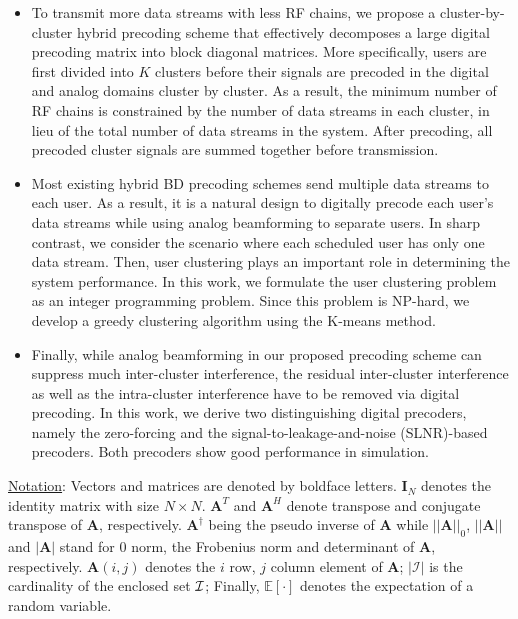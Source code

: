 \documentclass[conference]{IEEEtran}
\begin{document}
\begin{itemize}[leftmargin=*]
\item To transmit more data streams with less RF chains, we propose a cluster-by-cluster hybrid precoding scheme that effectively decomposes a large digital precoding matrix into block diagonal matrices. More specifically, users are first divided into $K$ clusters before their signals are precoded in the digital and analog domains cluster by cluster. As a result, the minimum number of RF chains is constrained by the number of data streams in each cluster, in lieu of the total number of data streams in the system. After precoding, all precoded cluster signals are summed together before transmission.
\item Most existing hybrid BD precoding schemes send multiple data streams to each user. As a result, it is a natural design to digitally precode each user's data streams while using analog beamforming to separate users. In sharp contrast, we consider the scenario where each scheduled user has only one data stream. Then, user clustering plays an important role in determining the system performance. In this work, we formulate the user clustering problem as an integer programming problem. Since this problem is NP-hard, we develop a greedy clustering algorithm using the K-means method.
\item Finally, while analog beamforming in our proposed precoding scheme can suppress much inter-cluster interference, the residual inter-cluster interference as well as the intra-cluster interference have to be removed via digital precoding. In this work, we derive two distinguishing digital precoders, namely the zero-forcing and the signal-to-leakage-and-noise (SLNR)-based precoders. Both precoders show good performance in simulation.
\end{itemize}


\underline{Notation}: Vectors and matrices are denoted by boldface letters. $\bm{I}_N$ denotes the identity matrix with size $N\times N$. ${\bm A}^T$ and ${\bm A}^H$ denote transpose and conjugate transpose of ${\bm A}$, respectively. $\bm{A}^\dagger$ being the pseudo inverse of $\bm{A}$ while $||\bm{A}||_0$, $||\bm{A}|| $ and $|\bm{A}|$ stand for $0$ norm, the Frobenius norm and determinant of ${\bm A}$, respectively. $\bm{A}(i,j)$ denotes the $i$ row, $j$ column element of ${\bm A}$; $|\mathcal{I}|$ is the cardinality of the enclosed set ${\cal I}$; Finally, $\mathbb{E}[\cdot] $ denotes the expectation of a random variable.
\end{document}
